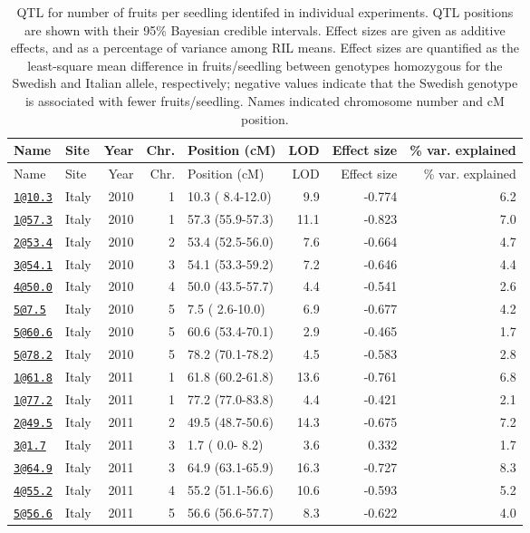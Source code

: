 \documentclass[
]{article}
\begin{document}
\begin{longtable}[]{@{}llrrlrrr@{}}
\caption{\label{tab:individual-ffit-qtl}QTL for number of fruits per seedling identifed in individual experiments. QTL positions are shown with their 95\% Bayesian credible intervals. Effect sizes are given as additive effects, and as a percentage of variance among RIL means. Effect sizes are quantified as the least-square mean difference in fruits/seedling between genotypes homozygous for the Swedish and Italian allele, respectively; negative values indicate that the Swedish genotype is associated with fewer fruits/seedling. Names indicated chromosome number and cM position.}\tabularnewline
\toprule
Name & Site & Year & Chr. & Position (cM) & LOD & Effect size & \% var. explained\tabularnewline
\midrule
\endfirsthead
\toprule
Name & Site & Year & Chr. & Position (cM) & LOD & Effect size & \% var. explained\tabularnewline
\midrule
\endhead
\href{mailto:1@10.3}{\nolinkurl{1@10.3}} & Italy & 2010 & 1 & 10.3 ( 8.4-12.0) & 9.9 & -0.774 & 6.2\tabularnewline
\href{mailto:1@57.3}{\nolinkurl{1@57.3}} & Italy & 2010 & 1 & 57.3 (55.9-57.3) & 11.1 & -0.823 & 7.0\tabularnewline
\href{mailto:2@53.4}{\nolinkurl{2@53.4}} & Italy & 2010 & 2 & 53.4 (52.5-56.0) & 7.6 & -0.664 & 4.7\tabularnewline
\href{mailto:3@54.1}{\nolinkurl{3@54.1}} & Italy & 2010 & 3 & 54.1 (53.3-59.2) & 7.2 & -0.646 & 4.4\tabularnewline
\href{mailto:4@50.0}{\nolinkurl{4@50.0}} & Italy & 2010 & 4 & 50.0 (43.5-57.7) & 4.4 & -0.541 & 2.6\tabularnewline
\href{mailto:5@7.5}{\nolinkurl{5@7.5}} & Italy & 2010 & 5 & 7.5 ( 2.6-10.0) & 6.9 & -0.677 & 4.2\tabularnewline
\href{mailto:5@60.6}{\nolinkurl{5@60.6}} & Italy & 2010 & 5 & 60.6 (53.4-70.1) & 2.9 & -0.465 & 1.7\tabularnewline
\href{mailto:5@78.2}{\nolinkurl{5@78.2}} & Italy & 2010 & 5 & 78.2 (70.1-78.2) & 4.5 & -0.583 & 2.8\tabularnewline
\href{mailto:1@61.8}{\nolinkurl{1@61.8}} & Italy & 2011 & 1 & 61.8 (60.2-61.8) & 13.6 & -0.761 & 6.8\tabularnewline
\href{mailto:1@77.2}{\nolinkurl{1@77.2}} & Italy & 2011 & 1 & 77.2 (77.0-83.8) & 4.4 & -0.421 & 2.1\tabularnewline
\href{mailto:2@49.5}{\nolinkurl{2@49.5}} & Italy & 2011 & 2 & 49.5 (48.7-50.6) & 14.3 & -0.675 & 7.2\tabularnewline
\href{mailto:3@1.7}{\nolinkurl{3@1.7}} & Italy & 2011 & 3 & 1.7 ( 0.0- 8.2) & 3.6 & 0.332 & 1.7\tabularnewline
\href{mailto:3@64.9}{\nolinkurl{3@64.9}} & Italy & 2011 & 3 & 64.9 (63.1-65.9) & 16.3 & -0.727 & 8.3\tabularnewline
\href{mailto:4@55.2}{\nolinkurl{4@55.2}} & Italy & 2011 & 4 & 55.2 (51.1-56.6) & 10.6 & -0.593 & 5.2\tabularnewline
\href{mailto:5@56.6}{\nolinkurl{5@56.6}} & Italy & 2011 & 5 & 56.6 (56.6-57.7) & 8.3 & -0.622 & 4.0\tabularnewline

\end{longtable}
\end{document}
